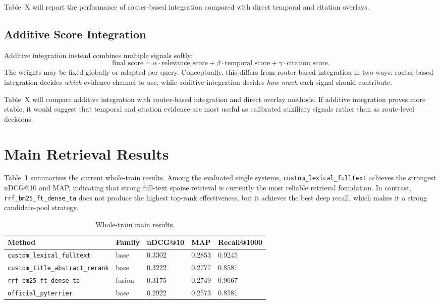 \documentclass[11pt]{article}
\begin{document}
Table~X will report the performance of router-based integration compared with direct temporal and citation overlays.

\subsection{Additive Score Integration}

Additive integration instead combines multiple signals softly:
\[
\mathrm{final\_score} = \alpha \cdot \mathrm{relevance\_score} + \beta \cdot \mathrm{temporal\_score} + \gamma \cdot \mathrm{citation\_score}.
\]
The weights may be fixed globally or adapted per query. Conceptually, this differs from router-based integration in two ways: router-based integration decides \emph{which} evidence channel to use, while additive integration decides \emph{how much} each signal should contribute.

Table~X will compare additive integration with router-based integration and direct overlay methods. If additive integration proves more stable, it would suggest that temporal and citation evidence are most useful as calibrated auxiliary signals rather than as route-level decisions.

\section{Main Retrieval Results}

Table~\ref{tab:whole-train} summarizes the current whole-train results. Among the evaluated single systems, \texttt{custom\_lexical\_fulltext} achieves the strongest nDCG@10 and MAP, indicating that strong full-text sparse retrieval is currently the most reliable retrieval foundation. In contrast, \texttt{rrf\_bm25\_ft\_dense\_ta} does not produce the highest top-rank effectiveness, but it achieves the best deep recall, which makes it a strong candidate-pool strategy.

\begin{table}[ht]
\centering
\caption{Whole-train main results.}
\label{tab:whole-train}
\begin{tabular}{lllll}
\toprule
Method & Family & nDCG@10 & MAP & Recall@1000 \\
\midrule
\texttt{custom\_lexical\_fulltext} & base & 0.3302 & 0.2853 & 0.9245 \\
\texttt{custom\_title\_abstract\_rerank} & base & 0.3222 & 0.2777 & 0.8581 \\
\texttt{rrf\_bm25\_ft\_dense\_ta} & fusion & 0.3175 & 0.2749 & 0.9667 \\
\texttt{official\_pyterrier} & base & 0.2922 & 0.2573 & 0.8581 \\
\bottomrule
\end{tabular}
\end{table}
\end{document}
